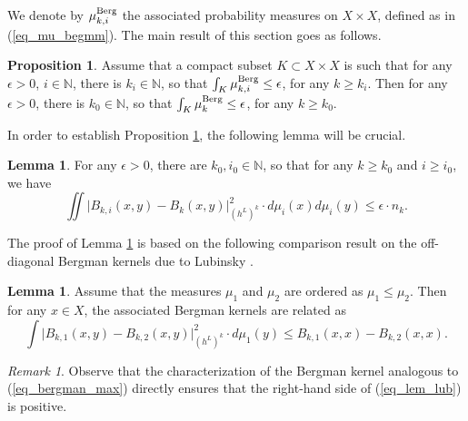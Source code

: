 \documentclass[12pt]{article}
\numberwithin{equation}{section}
\theoremstyle{theorem}
\theoremstyle{definition}
\newtheorem{prop}[thm]{Proposition}
\newtheorem{lem}[thm]{Lemma}
\theoremstyle{remark}
\newtheorem{rem}[thm]{Remark}
\newcommand{\nat}{\mathbb{N}}
\begin{document}
	We denote by $\mu_{k, i}^{\rm{Berg}}$ the associated probability measures on $X \times X$, defined as in (\ref{eq_mu_begmm}).
	The main result of this section goes as follows.
	\begin{prop}\label{prop_reduc}
		Assume that a compact subset $K \subset X \times X$ is such that for any $\epsilon > 0$, $i \in \nat$, there is $k_i \in \nat$, so that $\int_K \mu_{k, i}^{\rm{Berg}} \leq \epsilon$, for any $k \geq k_i$.
		Then for any $\epsilon > 0$, there is $k_0 \in \nat$, so that $\int_K \mu_{k}^{\rm{Berg}} \leq \epsilon$, for any $k \geq k_0$.
	\end{prop}
	In order to establish Proposition \ref{prop_reduc}, the following lemma will be crucial.
	\begin{lem}\label{lem_local_regul}
		For any $\epsilon > 0$, there are $k_0, i_0 \in \nat$, so that for any $k \geq k_0$ and $i \geq i_0$, we have
		\begin{equation}
			 \iint \Big| B_{k, i}(x, y) - B_k(x, y) \Big|_{(h^L)^k}^2 \cdot d \mu_i(x) d \mu_i(y)
			 \leq
			 \epsilon \cdot n_k.
		\end{equation}
	\end{lem}
	The proof of Lemma \ref{lem_local_regul} is based on the following comparison result on the off-diagonal Bergman kernels due to Lubinsky \cite[(3.3)]{LubinskyUnivers}.
	\begin{lem}\label{lem_lub}
		Assume that the measures $\mu_1$ and $\mu_2$ are ordered as $\mu_1 \leq \mu_2$.
		Then for any $x \in X$, the associated Bergman kernels are related as
		\begin{equation}\label{eq_lem_lub}
			\int
			\Big|
			B_{k, 1}(x, y)
			-
			B_{k, 2}(x, y)
			\Big|_{(h^L)^k}^2 
			\cdot
			d \mu_1(y)
			\leq
			B_{k, 1}(x, x)
			-
			B_{k, 2}(x, x).
		\end{equation}
	\end{lem}
	\begin{rem}\label{rem_lub}
		Observe that the characterization of the Bergman kernel analogous to (\ref{eq_bergman_max}) directly ensures that the right-hand side of (\ref{eq_lem_lub}) is positive.
	\end{rem}
\end{document}
